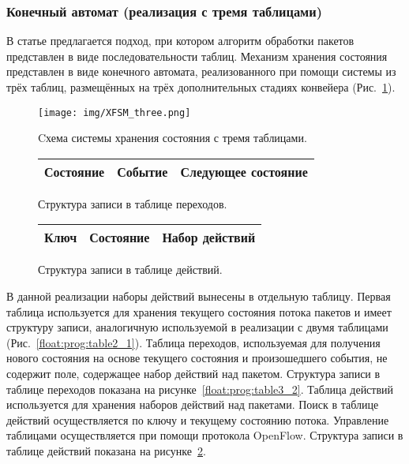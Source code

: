 \documentclass[conference]{IEEEtran}
\begin{document}
\subsubsection{Конечный автомат (реализация с тремя таблицами)}
В статье \cite{bib:Zhu:forwarding}
предлагается подход, при котором алгоритм обработки пакетов представлен в
виде последовательности таблиц. Механизм хранения состояния представлен
в виде конечного автомата, реализованного при помощи системы из трёх
таблиц, размещённых на трёх дополнительных стадиях конвейера
(Рис.~\ref{float:prog:table_three_general}).

\begin{figure}
	\centering
	\texttt{[image: img/XFSM\_three.png]}
	\caption{Cхема системы хранения состояния с тремя таблицами.}
	\label{float:prog:table_three_general}
\end{figure}

\begin{figure}
	\centering

	\begin{tabular}{|c|c|c|}
		\hline
		Состояние & Событие & Следующее состояние \\
		\hline

	\end{tabular}

	\caption{Структура записи в таблице переходов.}
	\label{float:prog:table3_2}
	\centerline{}

	\begin{tabular}{|c|c|c|}
		\hline
		Ключ & Состояние & Набор действий \\
		\hline

	\end{tabular}

	\caption{Структура записи в таблице действий.}
	\label{float:prog:table3_3}

\end{figure}

В данной реализации наборы действий вынесены в отдельную таблицу.
Первая таблица используется для хранения
текущего состояния потока пакетов и имеет структуру записи, аналогичную
используемой в реализации с двумя таблицами (Рис.~\ref{float:prog:table2_1}).
Таблица переходов, используемая для получения
нового состояния на основе текущего состояния и произошедшего события,
не содержит поле, содержащее набор действий над пакетом.
Структура записи в таблице переходов показана на
рисунке~\ref{float:prog:table3_2}.
Таблица действий используется для хранения наборов действий над пакетами.
Поиск в таблице действий осуществляется по ключу и текущему состоянию потока.
Управление таблицами осуществляется при помощи протокола OpenFlow.
Структура записи в таблице действий показана на
рисунке~\ref{float:prog:table3_3}.
\end{document}
